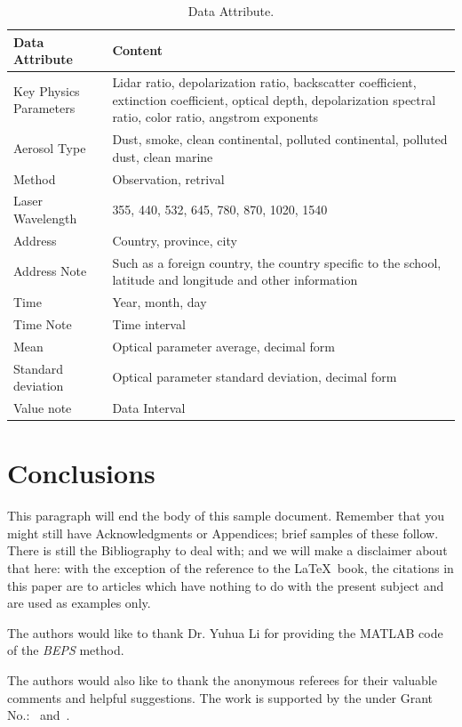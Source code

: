 \begin{table}
	\caption{Data Attribute.}
	\label{tab:freq}
	\begin{tabular}{lp{}}
		\toprule
		Data Attribute&Content\\
		\midrule
		Key Physics Parameters & Lidar ratio, depolarization ratio, backscatter coefficient, extinction coefficient, optical depth, depolarization spectral ratio, color ratio, angstrom exponents\\
		Aerosol Type & Dust, smoke, clean continental, polluted continental, polluted dust, clean marine\\
		Method & Observation, retrival\\
		Laser Wavelength & 355, 440, 532, 645, 780, 870, 1020, 1540\\
		Address & Country, province, city\\
		Address Note & Such as a foreign country, the country specific to the school, latitude and longitude and other information\\
		Time & Year, month, day\\
		Time Note & Time interval\\
		Mean & Optical parameter average, decimal form\\
		Standard deviation & Optical parameter standard deviation, decimal form\\
		Value note & Data Interval\\
		\bottomrule
	\end{tabular}
\end{table}



\section{Conclusions}
This paragraph will end the body of this sample document.
Remember that you might still have Acknowledgments or
Appendices; brief samples of these
follow.  There is still the Bibliography to deal with; and
we will make a disclaimer about that here: with the exception
of the reference to the \LaTeX\ book, the citations in
this paper are to articles which have nothing to
do with the present subject and are used as
examples only.


\begin{acks}
	The authors would like to thank Dr. Yuhua Li for providing the
	MATLAB code of the \textit{BEPS} method.
	
	The authors would also like to thank the anonymous referees for
	their valuable comments and helpful suggestions. The work is
	supported by the  under Grant
	No.:~
	and~.
	
\end{acks}
